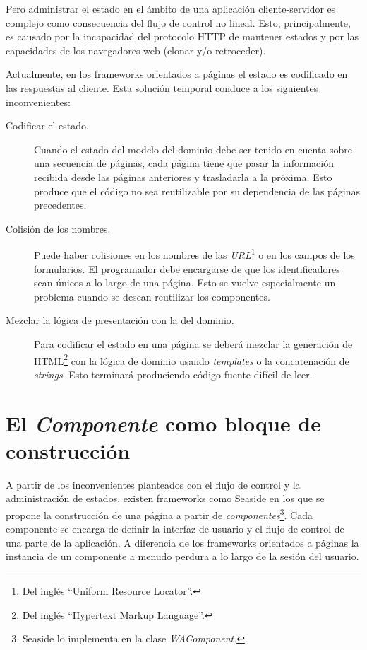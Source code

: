 Pero administrar el estado en el ámbito de una aplicación cliente-servidor es complejo como consecuencia del flujo de control no lineal. Esto, principalmente, es causado por la incapacidad del protocolo HTTP de mantener estados y por las capacidades de los navegadores web (clonar y/o retroceder).

Actualmente, en los frameworks orientados a páginas el estado es codificado en las respuestas al cliente. Esta solución temporal conduce a los siguientes inconvenientes:


\begin{description}

\item[Codificar el estado.]

Cuando el estado del modelo del dominio debe ser tenido en cuenta sobre una secuencia de páginas, cada página tiene que pasar la información recibida desde las páginas anteriores y trasladarla a la próxima. Esto produce que el código no sea reutilizable por su dependencia de las páginas precedentes.

\item[Colisión de los nombres.]

Puede haber colisiones en los nombres de las \emph{URL}\footnote{Del inglés ``Uniform Resource Locator''.} o en los campos de los formularios. El programador debe encargarse de que los identificadores sean únicos a lo largo de una página. Esto se vuelve especialmente un problema cuando se desean reutilizar los componentes.

\item[Mezclar la lógica de presentación con la del dominio.]

Para codificar el estado en una página se deberá mezclar la generación de HTML\footnote{Del inglés ``Hypertext Markup Language''.} con la lógica de dominio usando \emph{templates} o la concatenación de \emph{strings}. Esto terminará produciendo código fuente difícil de leer.

\end{description}


\section{El \emph{Componente} como bloque de construcción}

A partir de los inconvenientes planteados con el flujo de control y la administración de estados, existen frameworks como Seaside en los que se propone la construcción de una página a partir de \emph{componentes}\footnote{Seaside lo implementa en la clase \emph{WAComponent}.}. Cada componente se encarga de definir la interfaz de usuario y el flujo de control de una parte de la aplicación. A diferencia de los frameworks orientados a páginas la instancia de un componente a menudo perdura a lo largo de la sesión del usuario.


